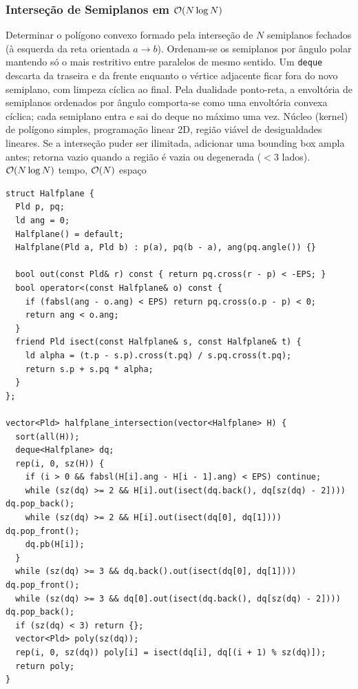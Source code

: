 \subsubsection{Interseção de Semiplanos em $\mathcal{O}(N \log N)$}
\algobox
  {Determinar o polígono convexo formado pela interseção de $N$ semiplanos fechados (à esquerda da reta orientada $a \to b$).}
  {Ordenam-se os semiplanos por ângulo polar mantendo só o mais restritivo entre paralelos de mesmo sentido. Um \texttt{deque} descarta da traseira e da frente enquanto o vértice adjacente ficar fora do novo semiplano, com limpeza cíclica ao final.}
  {Pela dualidade ponto-reta, a envoltória de semiplanos ordenados por ângulo comporta-se como uma envoltória convexa cíclica; cada semiplano entra e sai do deque no máximo uma vez.}
  {Núcleo (kernel) de polígono simples, programação linear 2D, região viável de desigualdades lineares.}
  {Se a interseção puder ser ilimitada, adicionar uma bounding box ampla antes; retorna vazio quando a região é vazia ou degenerada ($< 3$ lados).}
  {$\mathcal{O}(N \log N)$ tempo, $\mathcal{O}(N)$ espaço}

\begin{lstlisting}
struct Halfplane {
  Pld p, pq;
  ld ang = 0;
  Halfplane() = default;
  Halfplane(Pld a, Pld b) : p(a), pq(b - a), ang(pq.angle()) {}

  bool out(const Pld& r) const { return pq.cross(r - p) < -EPS; }
  bool operator<(const Halfplane& o) const {
    if (fabsl(ang - o.ang) < EPS) return pq.cross(o.p - p) < 0;
    return ang < o.ang;
  }
  friend Pld isect(const Halfplane& s, const Halfplane& t) {
    ld alpha = (t.p - s.p).cross(t.pq) / s.pq.cross(t.pq);
    return s.p + s.pq * alpha;
  }
};

vector<Pld> halfplane_intersection(vector<Halfplane> H) {
  sort(all(H));
  deque<Halfplane> dq;
  rep(i, 0, sz(H)) {
    if (i > 0 && fabsl(H[i].ang - H[i - 1].ang) < EPS) continue;
    while (sz(dq) >= 2 && H[i].out(isect(dq.back(), dq[sz(dq) - 2]))) dq.pop_back();
    while (sz(dq) >= 2 && H[i].out(isect(dq[0], dq[1]))) dq.pop_front();
    dq.pb(H[i]);
  }
  while (sz(dq) >= 3 && dq.back().out(isect(dq[0], dq[1]))) dq.pop_front();
  while (sz(dq) >= 3 && dq[0].out(isect(dq.back(), dq[sz(dq) - 2]))) dq.pop_back();
  if (sz(dq) < 3) return {};
  vector<Pld> poly(sz(dq));
  rep(i, 0, sz(dq)) poly[i] = isect(dq[i], dq[(i + 1) % sz(dq)]);
  return poly;
}
\end{lstlisting}

